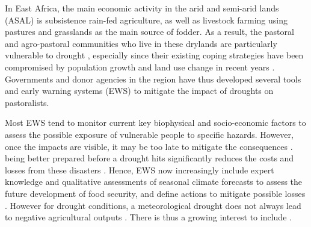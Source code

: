 \documentclass[review]{elsarticle}
\begin{document}
In East Africa, the main economic activity in the arid and semi-arid lands (ASAL) is subsistence rain-fed agriculture, as well as livestock farming using pastures and grasslands as the main source of fodder. As a result, the pastoral and agro-pastoral communities who live in these drylands are particularly vulnerable to drought 
\citep{Nyong2007,orindi2007pastoral}, especially since their existing coping strategies have been compromised by population growth and land use change in recent years \citep{Galvin2001ImpactsOC}. %
Governments and donor agencies in the region have thus developed several tools and early warning systems (EWS) to mitigate the impact of droughts on pastoralists.

Most EWS tend to monitor current key biophysical and socio-economic factors to assess the possible exposure of vulnerable people to specific hazards. However, once the impacts are visible, it may be too late to mitigate the consequences \citep{kogan}.  being better prepared before a drought hits significantly reduces the costs and losses from these disasters \citep{venton2012economics}. Hence, EWS now increasingly include expert knowledge and qualitative assessments of seasonal climate forecasts to assess the future development of food security, and define actions to mitigate possible losses \citep{nhess-15-895-2015,TozierdelaPoterie2015}. However for drought conditions, a meteorological drought does not always lead to negative agricultural outputs \citep{BHUIYAN2006289}. There is thus a growing interest to include  \citep{wmo2015wmo,nhess-2018-26,Sutanto2019}.
\end{document}
